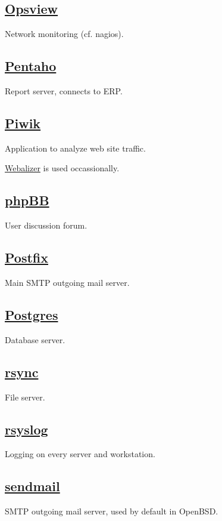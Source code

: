 \subsection{\href{http://www.opsview.com/}{Opsview}}
Network monitoring (cf. nagios).

\subsection{\href{http://community.pentaho.com/}{Pentaho}}
Report server, connects to ERP.

\subsection{\href{https://www.piwiki.org/}{Piwik}}
Application to analyze web site traffic.

\href{http://www.mrunix.net/webalizer/}{Webalizer} is used occassionally.

\subsection{\href{https://www.phpbb.com/}{phpBB}}
User discussion forum.

\subsection{\href{http://www.postfix.org/}{Postfix}}
Main SMTP outgoing mail server.

\subsection{\href{http://www.postgresql.org/}{Postgres}}
Database server.

\subsection{\href{http://rsync.samba.org/}{rsync}}
File server.

\subsection{\href{http://www.rsyslog.com/}{rsyslog}}
Logging on every server and workstation.

\subsection{\href{http://www.openbsd.org/cgi-bin/man.cgi/OpenBSD-current/man8/sendmail.8?query=sendmail&sec=8}{sendmail}}
SMTP outgoing mail server, used by default in OpenBSD.

